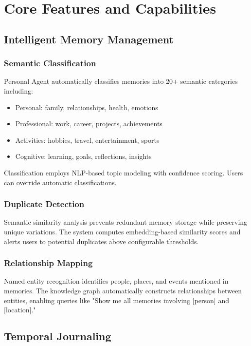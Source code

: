 \documentclass[11pt,letterpaper]{article}
\begin{document}
\section{Core Features and Capabilities}

\subsection{Intelligent Memory Management}

\subsubsection{Semantic Classification}

Personal Agent automatically classifies memories into 20+ semantic categories including:
\begin{itemize}
\item Personal: family, relationships, health, emotions
\item Professional: work, career, projects, achievements
\item Activities: hobbies, travel, entertainment, sports
\item Cognitive: learning, goals, reflections, insights
\end{itemize}

Classification employs NLP-based topic modeling with confidence scoring. Users can override automatic classifications.

\subsubsection{Duplicate Detection}

Semantic similarity analysis prevents redundant memory storage while preserving unique variations. The system computes embedding-based similarity scores and alerts users to potential duplicates above configurable thresholds.

\subsubsection{Relationship Mapping}

Named entity recognition identifies people, places, and events mentioned in memories. The knowledge graph automatically constructs relationships between entities, enabling queries like "Show me all memories involving [person] and [location]."

\subsection{Temporal Journaling}
\end{document}
